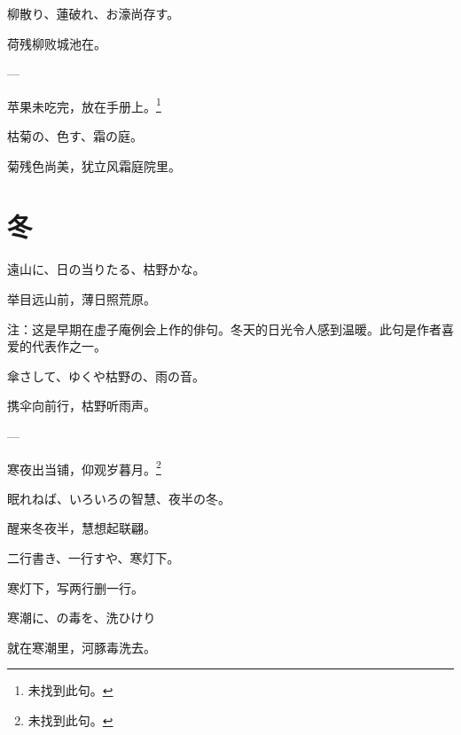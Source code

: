 \begin{haiku}
    {\FH 柳散り、蓮破れ、お濠尚存す。}

    {\FK 荷残柳败城池在。}
\end{haiku}

\begin{haiku}
    {\FH ---}

    {\FK 苹果未吃完，放在手册上。\footnote{\FT 未找到此句。}}
\end{haiku}

\begin{haiku}
    {\FH 枯菊の、色す、霜の庭。}

    {\FK 菊残色尚美，犹立风霜庭院里。}
\end{haiku}

\section{\FK 冬}

\setcounter{haikucounter}{0}

\begin{haiku}
    {\FH 遠山に、日の当りたる、枯野かな。}

    {\FK 举目远山前，薄日照荒原。}

    {\FT 注：这是早期在虚子庵例会上作的俳句。冬天的日光令人感到温暖。此句是作者喜爱的代表作之一。}
\end{haiku}

\begin{haiku}
    {\FH 傘さして、ゆくや枯野の、雨の音。}

    {\FK 携伞向前行，枯野听雨声。}
\end{haiku}

\begin{haiku}
    {\FH ---}

    {\FK 寒夜出当铺，仰观岁暮月。\footnote{\FT 未找到此句。}}
\end{haiku}

\begin{haiku}
    {\FH 眠れねば、いろいろの智慧、夜半の冬。}

    {\FK 醒来冬夜半，慧想起联翩。}
\end{haiku}

\begin{haiku}
    {\FH 二行書き、一行すや、寒灯下。}

    {\FK 寒灯下，写两行删一行。}
\end{haiku}

\begin{haiku}
    {\FH 寒潮に、の毒を、洗ひけり}

    {\FK 就在寒潮里，河豚毒洗去。}
\end{haiku}

